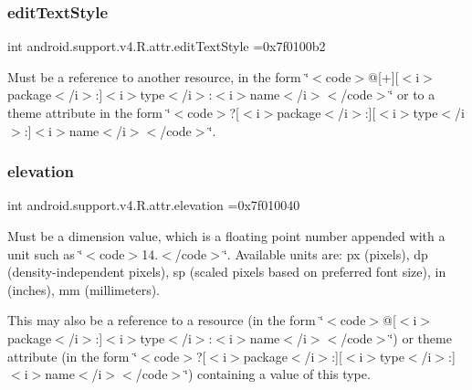 \subsubsection{\texorpdfstring{edit\+Text\+Style}{editTextStyle}}
{\footnotesize\ttfamily int android.\+support.\+v4.\+R.\+attr.\+edit\+Text\+Style =0x7f0100b2\hspace{0.3cm}{\ttfamily [static]}}

Must be a reference to another resource, in the form \char`\"{}$<$code$>$@\mbox{[}+\mbox{]}\mbox{[}$<$i$>$package$<$/i$>$\+:\mbox{]}$<$i$>$type$<$/i$>$\+:$<$i$>$name$<$/i$>$$<$/code$>$\char`\"{} or to a theme attribute in the form \char`\"{}$<$code$>$?\mbox{[}$<$i$>$package$<$/i$>$\+:\mbox{]}\mbox{[}$<$i$>$type$<$/i$>$\+:\mbox{]}$<$i$>$name$<$/i$>$$<$/code$>$\char`\"{}. \mbox{\label{classandroid_1_1support_1_1v4_1_1R_1_1attr_a5906f91b859c693a38a88ad3b0be4a39}} 
\subsubsection{\texorpdfstring{elevation}{elevation}}
{\footnotesize\ttfamily int android.\+support.\+v4.\+R.\+attr.\+elevation =0x7f010040\hspace{0.3cm}{\ttfamily [static]}}

Must be a dimension value, which is a floating point number appended with a unit such as \char`\"{}$<$code$>$14.\+5sp$<$/code$>$\char`\"{}. Available units are\+: px (pixels), dp (density-\/independent pixels), sp (scaled pixels based on preferred font size), in (inches), mm (millimeters). 

This may also be a reference to a resource (in the form \char`\"{}$<$code$>$@\mbox{[}$<$i$>$package$<$/i$>$\+:\mbox{]}$<$i$>$type$<$/i$>$\+:$<$i$>$name$<$/i$>$$<$/code$>$\char`\"{}) or theme attribute (in the form \char`\"{}$<$code$>$?\mbox{[}$<$i$>$package$<$/i$>$\+:\mbox{]}\mbox{[}$<$i$>$type$<$/i$>$\+:\mbox{]}$<$i$>$name$<$/i$>$$<$/code$>$\char`\"{}) containing a value of this type. \mbox{\label{classandroid_1_1support_1_1v4_1_1R_1_1attr_aeef469d93380b66cf16047dc17b8399c}} 
